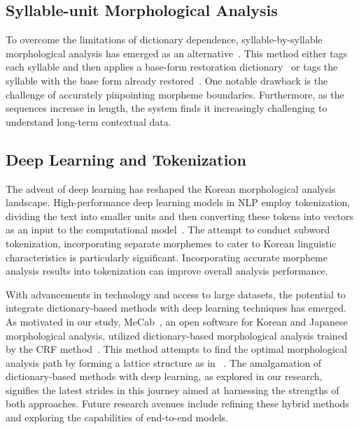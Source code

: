 \documentclass[AMS,STIX2COL]{WileyNJD-v2}
\begin{document}
    \subsection{Syllable-unit Morphological Analysis}\label{subsec2.2}
    To overcome the limitations of dictionary dependence, syllable-by-syllable morphological analysis has emerged as an alternative~\cite{ShimKS2011, LeeCK2013, LeeCH2016, KimHM2016, KimSW2018, ChoiYS2018, KimHM2019, MinJW2019, SongHJ2019, SongHJ2020, YounJY2021, ShinHJ2023}. This method either tags each syllable and then applies a base-form restoration dictionary~\cite{ShimKS2011, LeeCH2016} or tags the syllable with the base form already restored~\cite{YounJY2021}. One notable drawback is the challenge of accurately pinpointing morpheme boundaries. Furthermore, as the sequences increase in length, the system finds it increasingly challenging to understand long-term contextual data.

    \subsection{Deep Learning and Tokenization}\label{subsec2.3}
    The advent of deep learning has reshaped the Korean morphological analysis landscape. High-performance deep learning models in NLP employ tokenization, dividing the text into smaller units and then converting these tokens into vectors as an input to the computational model~\cite{Mikolov2013}. The attempt to conduct subword tokenization, incorporating separate morphemes to cater to Korean linguistic characteristics is particularly significant. Incorporating accurate morpheme analysis results into tokenization can improve overall analysis performance.

    With advancements in technology and access to large datasets, the potential to integrate dictionary-based methods with deep learning techniques has emerged. As motivated in our study, MeCab~\cite{MeCab}, an open software for Korean and Japanese morphological analysis, utilized dictionary-based morphological analysis trained by the CRF method~\cite{Lafferty2001}. This method attempts to find the optimal morphological analysis path by forming a lattice structure as in ~\cite{Kudo2004, NaSH2014, NaSH2015, NaSH2018}. The amalgamation of dictionary-based methods with deep learning, as explored in our research, signifies the latest strides in this journey aimed at harnessing the strengths of both approaches. Future research avenues include refining these hybrid methods and exploring the capabilities of end-to-end models.
\end{document}
